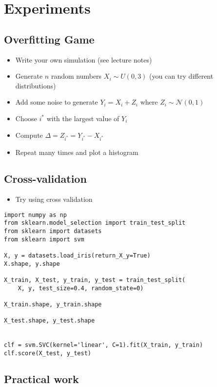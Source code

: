 \documentclass[11pt]{article}
\begin{document}
\section{Experiments}
\label{sec:orgdd704ef}

\subsection{Overfitting Game}
\label{sec:org80b31e2}
\begin{itemize}
\item Write your own simulation (see lecture notes)
\item Generate \(n\) random numbers \(X_i\sim U(0,3)\) (you can try different distributions)
\item Add some noise to generate \(Y_i = X_i + Z_i\) where \(Z_i\sim\mathcal{N}(0,1)\)
\item Choose \(i^*\) with the largest value of \(Y_i\)
\item Compute \(\Delta = Z_{i^*}= Y_{i^*}-X_{i^*}\)
\item Repeat many times and plot a histogram
\end{itemize}

\subsection{Cross-validation}
\label{sec:orgdc9dab4}
\begin{itemize}
\item Try using cross validation
\end{itemize}

\begin{verbatim}
import numpy as np
from sklearn.model_selection import train_test_split
from sklearn import datasets
from sklearn import svm

X, y = datasets.load_iris(return_X_y=True)
X.shape, y.shape

X_train, X_test, y_train, y_test = train_test_split(
    X, y, test_size=0.4, random_state=0)

X_train.shape, y_train.shape

X_test.shape, y_test.shape


clf = svm.SVC(kernel='linear', C=1).fit(X_train, y_train)
clf.score(X_test, y_test)
\end{verbatim}

\subsection{Practical work}
\label{sec:orgd857e28}
\end{document}
